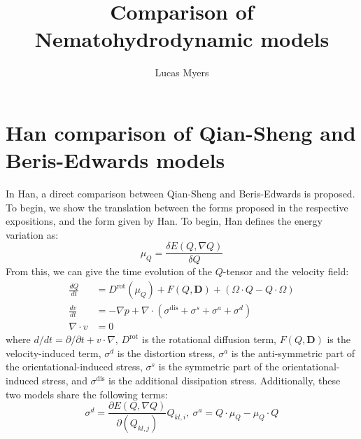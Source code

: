 \documentclass[reqno]{article}
\newcommand\rot{\text{rot}}
\newcommand\dis{\text{dis}}
\begin{document}
\title{Comparison of Nematohydrodynamic models}
\author{Lucas Myers}
\maketitle

\section{Han comparison of Qian-Sheng and Beris-Edwards models}
In Han, a direct comparison between Qian-Sheng and Beris-Edwards is proposed.
To begin, we show the translation between the forms proposed in the respective
expositions, and the form given by Han.
To begin, Han defines the energy variation as:
\begin{equation*}
  \mu_Q = \frac{\delta E(Q, \nabla Q)}{\delta Q}
\end{equation*}
From this, we can give the time evolution of the $Q$-tensor and the velocity
field:
\begin{align}
  \frac{dQ}{dt} &= D^\rot(\mu_Q) + F(Q, \mathbf{D}) + (\Omega \cdot Q - Q \cdot \Omega) \label{Q-eom} \\
  \frac{dv}{dt} &= -\nabla p + \nabla \cdot \left( \sigma^\dis + \sigma^s + \sigma^a + \sigma^d \right) \label{v-eom} \\
  \nabla \cdot v &= 0 \label{incompressibility}
\end{align}
where $d/dt = \partial/\partial t + v \cdot \nabla$, $D^\rot$ is the rotational
diffusion term, $F(Q, \mathbf{D})$ is the velocity-induced term, $\sigma^d$ is
the distortion stress, $\sigma^a$ is the anti-symmetric part of the
orientational-induced stress, $\sigma^s$ is the symmetric part of the
orientational-induced stress, and $\sigma^\dis$ is the additional dissipation
stress.
Additionally, these two models share the following terms:
\begin{equation}
  \sigma^d = \frac{\partial E(Q, \nabla Q)}{\partial (Q_{kl, j})} Q_{kl, i},
  \:
  \sigma^a = Q \cdot \mu_Q - \mu_Q \cdot Q
\end{equation}
\end{document}
